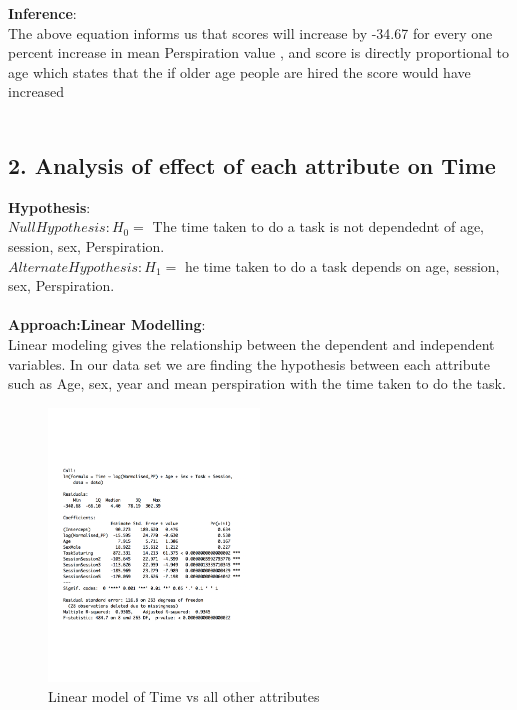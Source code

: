 \documentclass[12pt,epsf]{report}
\begin{document}
\textbf{Inference}:\\
The above equation informs us that scores will increase by -34.67 for every one percent increase in mean Perspiration value , and score is directly proportional to age which states that the if older age people are hired the score would have increased\\
\\
\FloatBarrier
\subsection*{2. Analysis of effect of each attribute on Time}
\textbf{Hypothesis}:\\
$Null Hypothesis : H_0 = $ The time taken to do a task is not dependednt of age, session, sex, Perspiration.\\
$Alternate Hypothesis : H_1 = $ he time taken to do a task depends on  age, session, sex, Perspiration.\\
\\
\textbf{Approach:Linear Modelling}:\\
Linear modeling gives the relationship between the dependent and independent variables. 
In our data set we are finding the hypothesis between each attribute such as Age, sex, year and mean perspiration with the time taken to do the task.\\
\begin{figure}[!htb]
	\centering
	\includegraphics[width=0.5\textwidth]{TimeSummary.pdf}
	\caption{Linear model of Time vs all other attributes}
	\centering
\end{figure}
\\
\end{document}
